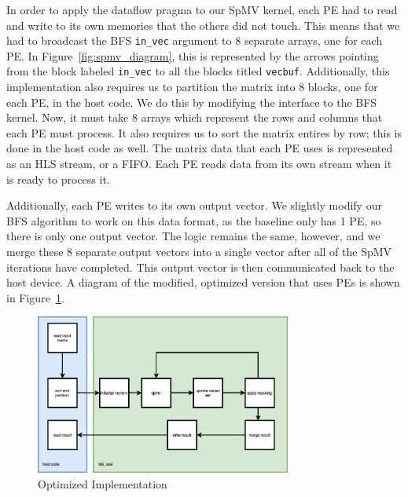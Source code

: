 \documentclass[10pt]{article}
\begin{document}
\noindent In order to apply the dataflow pragma to our SpMV kernel, each PE had to read and write to its own
memories that the others did not touch. This means that we had to broadcast the BFS \verb|in_vec| argument
to 8 separate arrays, one for each PE. In Figure~\ref{fig:spmv_diagram}, this is represented by the
arrows pointing from the block labeled \verb|in_vec| to all the blocks titled \verb|vecbuf|. Additionally,
this implementation also requires us to partition the matrix into 8 blocks, one for each PE, in the host
code. We do this by modifying the interface to the BFS kernel. Now, it must take 8 arrays which represent
the rows and columns that each PE must process. It also requires us to sort the matrix entires by row;
this is done in the host code as well. The matrix data that each PE uses is represented as an HLS stream,
or a FIFO. Each PE reads data from its own stream when it is ready to process it. \newline

\noindent Additionally, each PE writes to its own output vector. We slightly modify our BFS algorithm to work
on this data format, as the baseline only has 1 PE, so there is only one output vector. The logic remains
the same, however, and we merge these 8 separate output vectors into a single vector after all of the
SpMV iterations have completed. This output vector is then communicated back to the host device. A diagram
of the modified, optimized version that uses PEs is shown in Figure~\ref{fig:bfs_opt}. \newline

\begin{figure}[h!]
  \centering
  \includegraphics[width=0.75\textwidth]{bfs_opt.png}
  \caption{Optimized Implementation}
  \label{fig:bfs_opt}
\end{figure}
\end{document}
